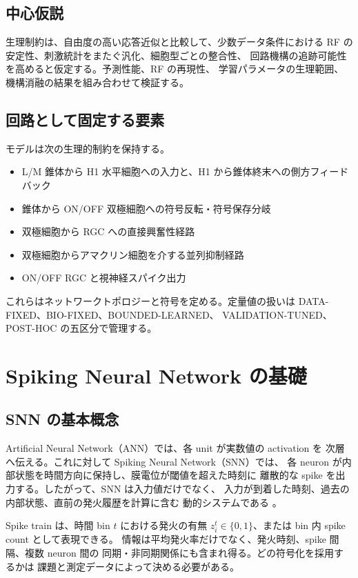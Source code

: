 \documentclass[a4paper,10pt,twocolumn,uplatex,dvipdfmx]{jsarticle}
\begin{document}
\subsection{中心仮説}

生理制約は、自由度の高い応答近似と比較して、少数データ条件における
RF の安定性、刺激統計をまたぐ汎化、細胞型ごとの整合性、
回路機構の追跡可能性を高めると仮定する。予測性能、RF の再現性、
学習パラメータの生理範囲、機構消融の結果を組み合わせて検証する。

\subsection{回路として固定する要素}

モデルは次の生理的制約を保持する。

\begin{itemize}
  \item L/M 錐体から H1 水平細胞への入力と、H1 から錐体終末への側方フィードバック
  \item 錐体から ON/OFF 双極細胞への符号反転・符号保存分岐
  \item 双極細胞から RGC への直接興奮性経路
  \item 双極細胞からアマクリン細胞を介する並列抑制経路
  \item ON/OFF RGC と視神経スパイク出力
\end{itemize}

これらはネットワークトポロジーと符号を定める。定量値の扱いは
DATA-FIXED、BIO-FIXED、BOUNDED-LEARNED、
VALIDATION-TUNED、POST-HOC の五区分で管理する。

\section{Spiking Neural Network の基礎}

\subsection{SNN の基本概念}

Artificial Neural Network（ANN）では、各 unit が実数値の activation を
次層へ伝える。これに対して Spiking Neural Network（SNN）では、
各 neuron が内部状態を時間方向に保持し、膜電位が閾値を超えた時刻に
離散的な spike を出力する。したがって、SNN は入力値だけでなく、
入力が到着した時刻、過去の内部状態、直前の発火履歴を計算に含む
動的システムである \cite{maass1997,gerstner2014}。

Spike train は、時間 bin $t$ における発火の有無
$z_i^t\in\{0,1\}$、または bin 内 spike count として表現できる。
情報は平均発火率だけでなく、発火時刻、spike 間隔、複数 neuron 間の
同期・非同期関係にも含まれ得る。どの符号化を採用するかは
課題と測定データによって決める必要がある。
\end{document}
